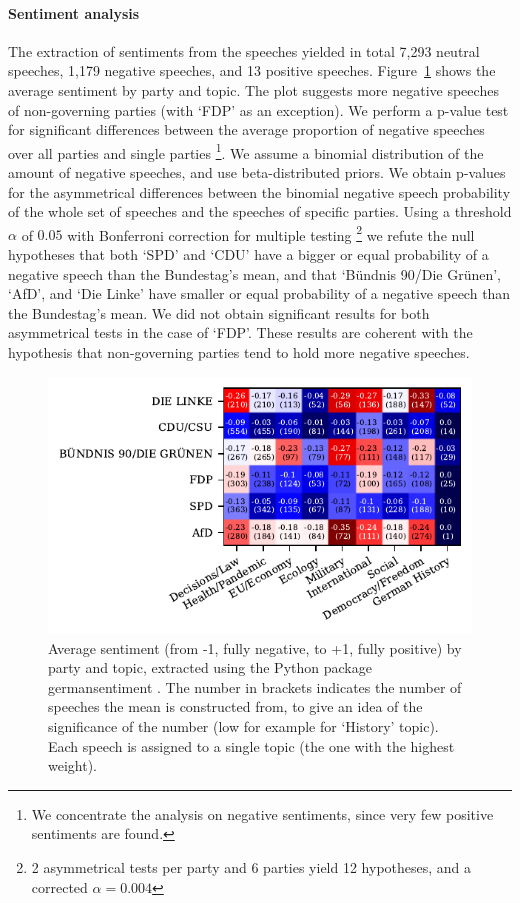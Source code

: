\documentclass{article}
\begin{document}
\paragraph{Sentiment analysis}
The extraction of sentiments from the speeches yielded in total 7,293 neutral speeches, 1,179 negative speeches, and 13 positive speeches.
Figure~\ref{sentiments_plot} shows the average sentiment by party and topic.
The plot suggests more negative speeches of non-governing parties (with `FDP' as an exception).
We perform a p-value test for significant differences between the average proportion of negative speeches over all parties and single parties
\footnote{We concentrate the analysis on negative sentiments, since very few positive sentiments are found.}.
We assume a binomial distribution of the amount of negative speeches, and use beta-distributed priors.
We obtain p-values for the asymmetrical differences between the binomial negative speech probability of the whole set of speeches and the speeches of specific parties.
Using a threshold $\alpha$ of $0.05$ with Bonferroni correction for multiple testing
\footnote{2 asymmetrical tests per party and 6 parties yield 12 hypotheses, and a corrected $\alpha=0.004$}
we refute the null hypotheses that both `SPD' and `CDU' have a bigger or equal probability of a negative speech than the Bundestag's mean,
and that `Bündnis 90/Die Grünen', `AfD', and `Die Linke' have smaller or equal probability of a negative speech than the Bundestag's mean.
We did not obtain significant results for both asymmetrical tests in the case of `FDP'.
These results are coherent with the hypothesis that non-governing parties tend to hold more negative speeches.

\begin{figure}
  \centering
  \includegraphics[width=0.9\linewidth]{images/sentiments_confusion.pdf}
  \captionsetup{width=0.9\linewidth}
  \caption{
    Average sentiment (from -1, fully negative, to +1, fully positive) by party and topic, extracted using the Python package germansentiment \cite{Germansentiment}.
    The number in brackets indicates the number of speeches the mean is constructed from, to give an idea of the significance of the number (low for example for `History' topic).
    Each speech is assigned to a single topic (the one with the highest weight).
  }
  \label{sentiments_plot}
\end{figure}
\end{document}
